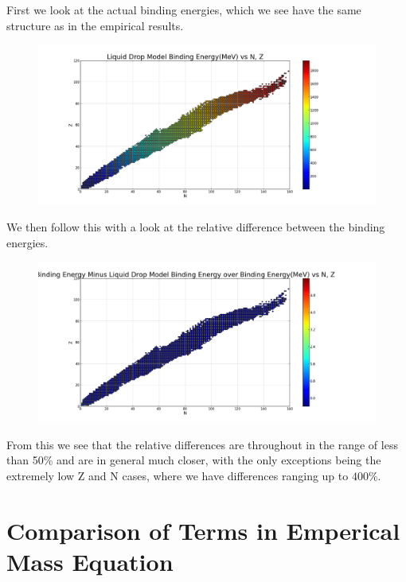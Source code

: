 \documentclass[11pt]{article} %
\begin{document}
First we look at the actual binding energies, which we see have the same structure as in the empirical results.
\vspace{1mm}
\begin{figure}[h]
\centering
\includegraphics[width=\linewidth]{"LiquidDropBindingEnergy"}
\end{figure}
\vspace{1mm}

We then follow this with a look at the relative difference between the binding energies.\\

\vspace{1mm}
\begin{figure}[h]
\centering
\includegraphics[width=\linewidth]{"ComparisonLiquidDropExpBE"}
\end{figure}
\vspace{1mm}
 
From this we see that the relative differences are throughout in the range of less than 50\% and are in general much closer, with the only exceptions being the extremely low Z and N cases, where we have differences ranging up to $400\%$. \\
\newpage

\section{Comparison of Terms in Emperical Mass Equation}
\end{document}
